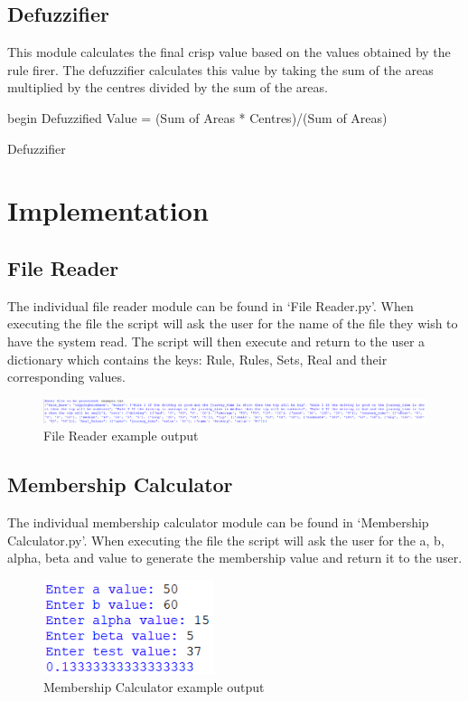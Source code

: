 \documentclass{article}
\begin{document}
\subsection{Defuzzifier} \label {defuzz}
This module calculates the final crisp value based on the values obtained by the rule firer. The defuzzifier calculates this value by taking the sum of the areas multiplied by the centres divided by the sum of the areas.

\begin{algorithm}[H]
\SetAlgoLined
{}
 begin\;
Defuzzified Value = (Sum of Areas * Centres)/(Sum of Areas)
 \caption{Defuzzifier}
\end{algorithm}

\section{Implementation}

\subsection{File Reader}
The individual file reader module can be found in ‘File Reader.py’. When executing the file the script will ask the user for the name of the file they wish to have the system read.  The script will then execute and return to the user a dictionary which contains the keys: Rule, Rules, Sets, Real and their corresponding values.

\begin{figure}[H]
\includegraphics[width=12cm]{example1}
\caption{File Reader example output}
\end{figure}

\subsection{Membership Calculator}
The individual membership calculator module can be found in ‘Membership Calculator.py’. When executing the file the script will ask the user for the a, b, alpha, beta and value to generate the membership value and return it to the user.  

\begin{figure}[H]
\centering
\includegraphics[width=5cm]{example2}
\caption{Membership Calculator example output}
\end{figure}
\end{document}

